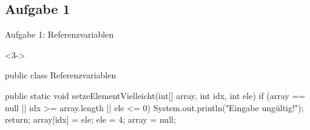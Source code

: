\subsection{Aufgabe 1}
{\taskenum
\begin{frame}[fragile]{Aufgabe 1: Referenzvariablen}
\vspace*{-4mm}
\begin{uncoverenv}<3->
\begin{plainjava}[multicols=2,lineskip=-.5pt,prebreak={},numbers=left,numbersep=2pt]
public class Referenzvariablen {
  public static void setzeElementVielleicht(int[] array, int idx, int ele) {
    if (array == null || idx >= array.length || ele <= 0) {
      System.out.println("Eingabe ungültig!");
      return;
    }
    array[idx] = ele;
    ele = 4;
    array = null;
  }

}
\end{plainjava}
\end{uncoverenv}
\end{frame}}
